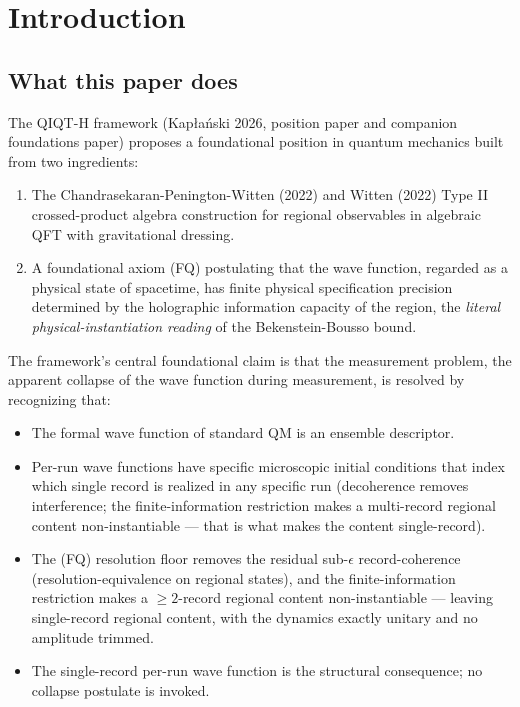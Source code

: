 \documentclass[11pt,a4paper]{article}
\begin{document}
\tableofcontents
\newpage


\section{Introduction}

\subsection{What this paper does}

The QIQT-H framework (Kapłański 2026, position paper and companion foundations paper) proposes a foundational position in quantum mechanics built from two ingredients:

\begin{enumerate}
  \item The Chandrasekaran-Penington-Witten (2022) and Witten (2022) Type II crossed-product algebra construction for regional observables in algebraic QFT with gravitational dressing.
  \item A foundational axiom (FQ) postulating that the wave function, regarded as a physical state of spacetime, has finite physical specification precision determined by the holographic information capacity of the region, the \emph{literal physical-instantiation reading} of the Bekenstein-Bousso bound.
\end{enumerate}

The framework's central foundational claim is that the measurement problem, the apparent collapse of the wave function during measurement, is resolved by recognizing that:

\begin{itemize}
  \item The formal wave function of standard QM is an ensemble descriptor.
  \item Per-run wave functions have specific microscopic initial conditions that index which single record is realized in any specific run (decoherence removes interference; the finite-information restriction makes a multi-record regional content non-instantiable — that is what makes the content single-record).
  \item The (FQ) resolution floor removes the residual sub-$\epsilon$ record-coherence (resolution-equivalence on regional states), and the finite-information restriction makes a $\ge 2$-record regional content non-instantiable — leaving single-record regional content, with the dynamics exactly unitary and no amplitude trimmed.
  \item The single-record per-run wave function is the structural consequence; no collapse postulate is invoked.
\end{itemize}
\end{document}
